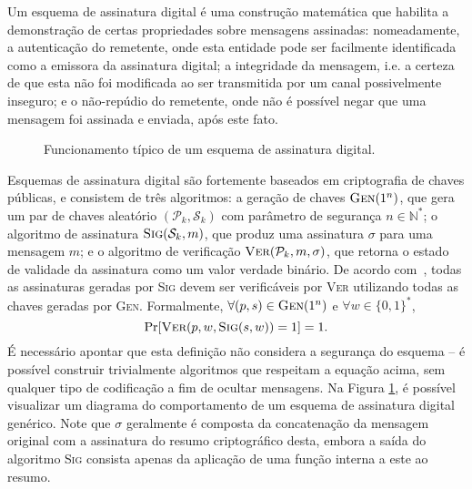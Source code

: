 \documentclass[12pt]{report}
\newcommand{\pk}{$\mathcal{P}_k$}
\newcommand{\sk}{$\mathcal{S}_k$}
\newcommand{\hash}[2][]{\mathcal{H}^{#1}(#2)}
\newcommand{\concat}{\, \vert \vert \,}
\begin{document}
Um esquema de assinatura digital é uma construção matemática que habilita a
demonstração de certas propriedades sobre mensagens assinadas: nomeadamente,
a autenticação do remetente, onde esta entidade pode ser facilmente
identificada como a emissora da assinatura digital; a integridade da mensagem,
i.e. a certeza de que esta não foi modificada ao ser transmitida por um canal
possivelmente inseguro; e o não-repúdio do remetente, onde não é possível negar
que uma mensagem foi assinada e enviada, após este fato.

\begin{figure}[ht]
  \centering
  \caption{Funcionamento típico de um esquema de assinatura digital.}
  \label{fig:2}
\end{figure}

Esquemas de assinatura digital são fortemente baseados em criptografia de
chaves públicas, e consistem de três algoritmos: a geração de chaves
$\textsc{Gen}(1^n)$, que gera um par de chaves aleatório $(\mathcal{P}_k,
\mathcal{S}_k)$ com parâmetro de segurança $n \in \mathbb{N}^{*}$; o algoritmo de assinatura
$\textsc{Sig}(\mathcal{S}_k, m)$, que produz uma assinatura $\sigma$ para uma
mensagem $m$; e o algoritmo de verificação $\textsc{Ver}(\mathcal{P}_k, m,
\sigma)$, que retorna o estado de validade da assinatura como um valor verdade
binário. De acordo com~\cite{Goldreich:2004:FCV:975541}, todas as assinaturas geradas por
\textsc{Sig} devem ser verificáveis por \textsc{Ver} utilizando todas as chaves
geradas por \textsc{Gen}. Formalmente, $\forall (p, s) \in
\textsc{Gen}(1^n)$ e $\forall w \in \{0, 1\}^{*}$,
\begin{equation}
    \text{Pr}[\textsc{Ver}(p, w, \textsc{Sig}(s, w)) = 1] = 1.
\end{equation}
É necessário apontar que esta definição não considera a segurança do esquema -- é possível construir trivialmente algoritmos que respeitam a equação acima, sem qualquer tipo de codificação a fim de ocultar mensagens. 
Na Figura \ref{fig:2}, é possível visualizar um diagrama do comportamento de
um esquema de assinatura digital genérico. Note que $\sigma$ geralmente é
composta da concatenação da mensagem original com a assinatura do resumo
criptográfico desta, embora a saída do algoritmo \textsc{Sig} consista apenas
da aplicação de uma função interna a este ao resumo.
\end{document}
